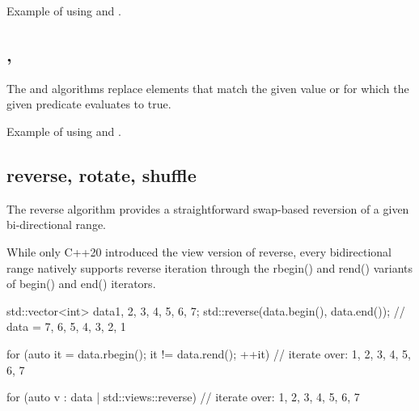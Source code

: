 \begin{box-note}
\footnotesize Example of using  and .
\tcblower
{}
\end{box-note}

\subsection{\texorpdfstring{, }{\texttt{std::remove}, \texttt{std::remove\_if}}}

The  and  algorithms replace elements that match the given value or for which the given predicate evaluates to true.


\begin{box-note}
\footnotesize Example of using  and .
\tcblower
{}
\end{box-note}

\subsection{reverse, rotate, shuffle}

The reverse algorithm provides a straightforward swap-based reversion of a given bi-directional range.



While only C++20 introduced the view version of reverse, every bidirectional range natively supports reverse iteration through the rbegin() and rend() variants of begin() and end() iterators.

\begin{box-note}
\begin{cppcode}
std::vector<int> data{1, 2, 3, 4, 5, 6, 7};
std::reverse(data.begin(), data.end());
// data = {7, 6, 5, 4, 3, 2, 1}

for (auto it = data.rbegin(); it != data.rend(); ++it) {
    // iterate over: 1, 2, 3, 4, 5, 6, 7
}

for (auto v : data | std::views::reverse) {
    // iterate over: 1, 2, 3, 4, 5, 6, 7
}
\end{cppcode}
\end{box-note}

